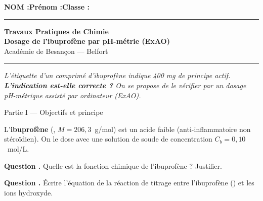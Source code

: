 \documentclass[11pt,a4paper]{article}
\newcommand{\sectitle}[1]{%
  \vspace{6pt}
  \noindent\colorbox{exoheader}{\parbox{\dimexpr\linewidth-2\fboxsep}%
    {\color{white}\bfseries\large\strut\quad #1}}
  \vspace{4pt}
}
\newcounter{question}
\newcommand{\question}{%
  \stepcounter{question}%
  \noindent\textcolor{exoheader}{\textbf{Question \thequestion.}}\quad
}
\begin{document}
\noindent\textbf{NOM :}\hfill\textbf{Prénom :}\hfill\textbf{Classe :}\hfill\phantom{x}\\[0.2cm]
\hrule\vspace{0.2cm}

\begin{center}
  {\large\bfseries\textcolor{exoheader}{Travaux Pratiques de Chimie}}\\[4pt]
  {\LARGE\bfseries Dosage de l'ibuprofène par pH-métrie (ExAO)}\\[2pt]
  {\small Académie de Besançon --- Belfort}
\end{center}
\hrule\vspace{6pt}

\begin{tcolorbox}[enhanced, colback=problemebg, colframe=exoheader, boxrule=1.5pt,
  title={\faFlask\quad Problématique},
  fonttitle=\bfseries\color{white},
  attach boxed title to top left={yshift=-2mm, xshift=4mm},
  boxed title style={colback=exoheader, colframe=exoheader}]
\textit{L'étiquette d'un comprimé d'ibuprofène indique 400 mg de principe actif.
\textbf{L'indication est-elle correcte ?}
On se propose de le vérifier par un dosage pH-métrique assisté par ordinateur (ExAO).}
\end{tcolorbox}

\vspace{6pt}

\sectitle{Partie I --- Objectifs et principe}

\begin{mdframed}[backgroundcolor=exolight, linecolor=exoheader, linewidth=1.2pt]
L'\textbf{ibuprofène} (, $M = 206{,}3$~g/mol) est un acide faible
(anti-inflammatoire non stéroïdien). On le dose avec une solution de soude
 de concentration $C_b = 0{,}10$~mol/L.
\end{mdframed}

\vspace{4pt}
\question Quelle est la fonction chimique de l'ibuprofène ? Justifier. \dotfill

\vspace{0.3cm}\noindent\dotfill

\vspace{4pt}
\question Écrire l'équation de la réaction de titrage entre l'ibuprofène () et les ions hydroxyde. \dotfill
\end{document}
